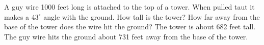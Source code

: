 {A guy wire 1000 feet long is attached to the top of a tower.  When pulled taut it makes a $43^{\circ}$ angle with the ground.  How tall is the tower?  How far away from the base of the tower does the wire hit the ground?}
{The tower is about 682 feet tall. The guy wire hits the ground about  731 feet away from the base of the tower.}
